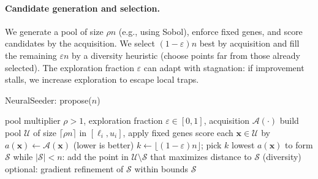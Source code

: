 \documentclass[12pt,a4paper]{article}
\begin{document}
\paragraph{Candidate generation and selection.}
We generate a pool of size $\rho n$ (e.g., using Sobol), enforce fixed genes, and score candidates by the acquisition. We select $(1-\varepsilon)n$ best by acquisition and fill the remaining $\varepsilon n$ by a diversity heuristic (choose points far from those already selected). The exploration fraction $\varepsilon$ can adapt with stagnation: if improvement stalls, we increase exploration to escape local traps.

\begin{algorithm}[H]
\caption{NeuralSeeder: propose($n$)}
\begin{algorithmic}[1]
\Require pool multiplier $\rho>1$, exploration fraction $\varepsilon\in[0,1]$, acquisition $\mathcal{A}(\cdot)$
\State build pool $\mathcal{U}$ of size $\lceil \rho n\rceil$ in $[\ell_i,u_i]$, apply fixed genes
\State score each $\bm{x}\in\mathcal{U}$ by $a(\bm{x})\leftarrow \mathcal{A}(\bm{x})$ (lower is better)
\State $k \leftarrow \lfloor (1-\varepsilon)n\rfloor$; pick $k$ lowest $a(\bm{x})$ to form $\mathcal{S}$
\State while $|\mathcal{S}|<n$: add the point in $\mathcal{U}\setminus\mathcal{S}$ that maximizes distance to $\mathcal{S}$ (diversity)
\State optional: gradient refinement of $\mathcal{S}$ within bounds
\State \Return $\mathcal{S}$
\end{algorithmic}
\end{algorithm}
\end{document}
